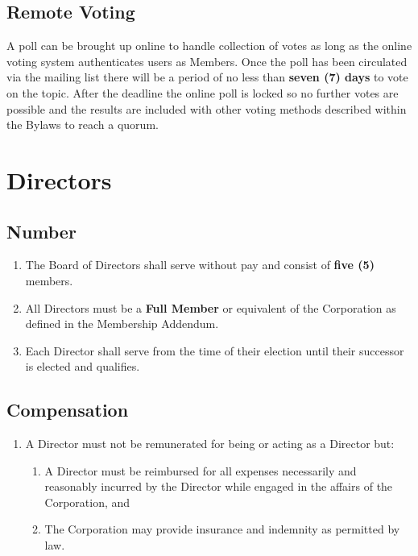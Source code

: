 \documentclass{article}
\begin{document}
\subsection{Remote Voting}
A poll can be brought up online to handle collection of votes as long as the online voting system authenticates users as Members. Once the poll has been circulated via the mailing list there will be a period of no less than \textbf{seven (7) days} to vote on the topic. After the deadline the online poll is locked so no further votes are possible and the results are included with other voting methods described within the Bylaws to reach a quorum.

\section{Directors}
\subsection{Number}
\begin{enumerate}
  \item The Board of Directors shall serve without pay and consist of \textbf{five (5)}
  members.
  \item All Directors must be a \textbf{Full Member} or equivalent of the Corporation as
  defined in the Membership Addendum.
  \item Each Director shall serve from the time of their election until their
  successor is elected and qualifies.
\end{enumerate}
\subsection{Compensation}
\begin{enumerate}
  \item A Director must not be remunerated for being or acting as a Director but:
  \begin{enumerate}
    \item A Director must be reimbursed for all expenses necessarily and
    reasonably incurred by the Director while engaged in the affairs of the Corporation, and
    \item The Corporation may provide insurance and indemnity as permitted by law.
  \end{enumerate}
\end{enumerate}
\end{document}
